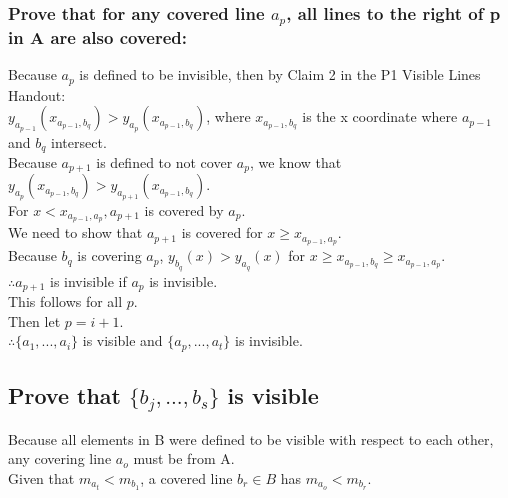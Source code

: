 \documentclass{article}
\begin{document}
    \subsubsection*{Prove that for any covered line $a_{p}$, all lines to the right of p in A are also covered:}
        Because $a_p$ is defined to be invisible, then by Claim 2 in the P1 Visible Lines Handout:\\
        $y_{a_{p-1}}(x_{a_{p-1}, b_{q}}) > y_{a_{p}}(x_{a_{p-1},b_{q}})$, where $x_{a_{p-1}, b_{q}}$ is the x coordinate where $a_{p-1}$ and $b_q$ intersect.\\
        Because $a_{p+1}$ is defined to not cover $a_p$, we know that $y_{a_{p}}(x_{a_{p-1}, b_{q}}) > y_{a_{p+1}}(x_{a_{p-1},b_{q}})$.\\
        For $x < x_{a_{p-1},a_{p}}, a_{p+1}$ is covered by $a_p$.\\
        We need to show that $a_{p+1}$ is covered for $x \geq x_{a_{p-1},a_{p}}$.\\
        Because $b_q$ is covering $a_p$, $y_{b_{q}}(x) > y_{a_{q}}(x)$ for $x \geq x_{a_{p-1},b_{q}} \geq x_{a_{p-1},a_{p}}$.\\
        $\therefore a_{p+1}$ is invisible if $a_{p}$ is invisible.\\
        This follows for all $p$.\\
        Then let $p = i + 1$.\\
        $\therefore \{a_1,...,a_i\}$ is visible and $\{a_p,...,a_t\}$ is invisible.\\

\subsection*{Prove that $\{b_{j},...,b_{s}\}$ is visible}
    Because all elements in B were defined to be visible with respect to each other, any covering line $a_{o}$ must be from A.\\
    Given that $m_{a_{t}} < m_{b_{1}}$, a covered line $b_{r} \in B$ has $m_{a_{o}} < m_{b_{r}}$.
    
\end{document}
